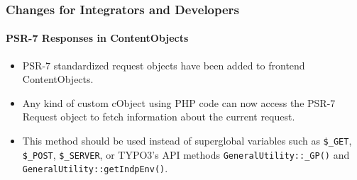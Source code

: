 %

\begin{frame}[fragile]
	\frametitle{Changes for Integrators and Developers}
	\framesubtitle{PSR-7 Responses in ContentObjects}

	\begin{itemize}
		\item PSR-7 standardized request objects have been added to frontend ContentObjects.
		\item Any kind of custom cObject using PHP code can now access the PSR-7
			Request object to fetch information about the current request.
		\item This method should be used instead of superglobal variables
			such as\newline
			\smaller\texttt{\$\_GET}, \texttt{\$\_POST}, \texttt{\$\_SERVER},\normalsize
			or TYPO3's API methods\newline
			\smaller\texttt{GeneralUtility::\_GP()}\normalsize
			and
			\smaller\texttt{GeneralUtility::getIndpEnv()}\normalsize.

	\end{itemize}
\end{frame}

